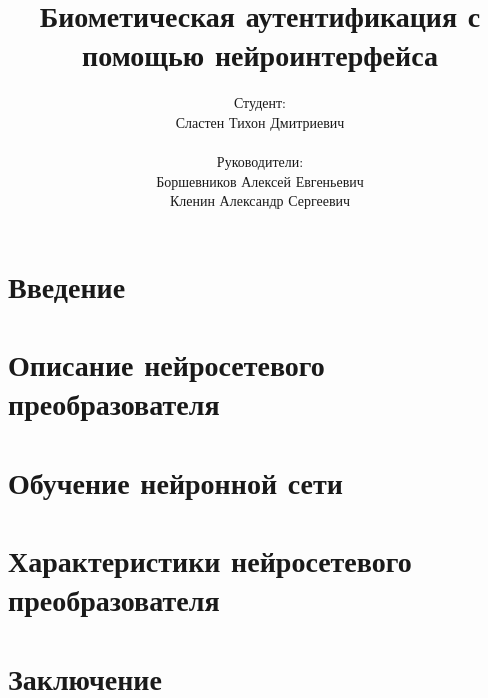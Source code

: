 \documentclass{beamer}
\title{Биометическая аутентификация с помощью нейроинтерфейса}
\author{
    Студент: \\ Сластен Тихон Дмитриевич \\ \\
    Руководители: \\ Боршевников Алексей Евгеньевич \\ Кленин Александр Сергеевич}
\institute{Б8303а Прикладная математика и информатика}
\date{}
\begin{document}
\maketitle

\section{Введение}






\section{Описание нейросетевого преобразователя}




\section{Обучение нейронной сети}



\section{Характеристики нейросетевого преобразователя}


\section{Заключение}

\end{document}
